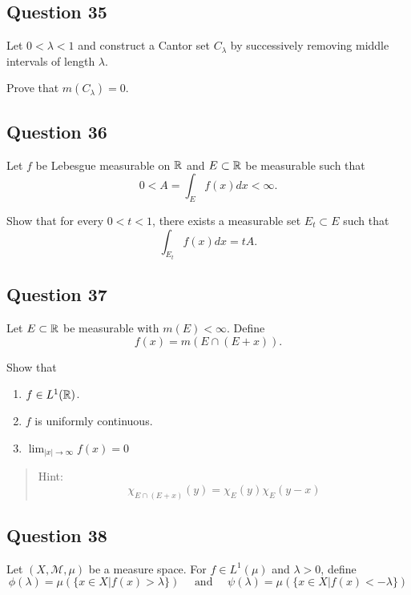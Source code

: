\documentclass[12pt]{article}
\providecommand{\tightlist}{%
  \setlength{\itemsep}{0pt}\setlength{\parskip}{0pt}}
\begin{document}
\hypertarget{question-35-1}{%
\subsection{Question 35}\label{question-35-1}}

Let \(0 < \lambda < 1\) and construct a Cantor set \(C_\lambda\) by
successively removing middle intervals of length \(\lambda\).

Prove that \(m(C_\lambda) = 0\).

\hypertarget{question-36-1}{%
\subsection{Question 36}\label{question-36-1}}

Let \(f\) be Lebesgue measurable on \({\mathbb{R}}\) and \(E \subset {\mathbb{R}}\) be
measurable such that \[
0<A=\int_{E} f(x) d x<\infty.
\]

Show that for every \(0 < t < 1\), there exists a measurable set
\(E_t \subset E\) such that \[
\int_{E_{t}} f(x) d x=t A.
\]

\hypertarget{question-37-1}{%
\subsection{Question 37}\label{question-37-1}}

Let \(E \subset {\mathbb{R}}\) be measurable with \(m(E) < \infty\). Define \[
f(x)=m(E \cap(E+x)).
\]

Show that

\begin{enumerate}
\def\labelenumi{\arabic{enumi}.}
\tightlist
\item
  \(f\in L^1({\mathbb{R}})\).
\item
  \(f\) is uniformly continuous.
\item
  \(\lim _{|x| \rightarrow \infty} f(x)=0\)
\end{enumerate}

\begin{quote}
Hint: \[
\chi_{E \cap(E+x)}(y)=\chi_{E}(y) \chi_{E}(y-x)
\]
\end{quote}

\hypertarget{question-38-1}{%
\subsection{Question 38}\label{question-38-1}}

Let \((X, \mathcal M, \mu)\) be a measure space. For \(f\in L^1(\mu)\)
and \(\lambda > 0\), define \[
\phi(\lambda)=\mu(\{x \in X | f(x)>\lambda\}) 
\quad \text { and } \quad 
\psi(\lambda)=\mu(\{x \in X | f(x)<-\lambda\})
\]
\end{document}

